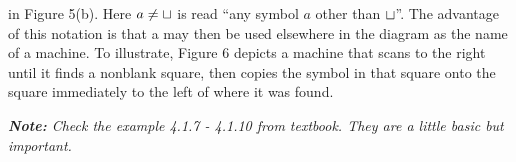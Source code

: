 \begin{example}{}
in Figure 5(b). Here $a \neq \sqcup$ is read ``any symbol $a$ other than $\sqcup$''. The advantage of this notation is that a may then be used elsewhere in the diagram as the name of a machine. To illustrate, Figure 6 depicts a machine that scans to the right until it finds a nonblank square, then copies the symbol in that square onto the square immediately to the left of where it was found.
\begin{figure}[H]
  \centering
  \begin{minipage}{.5\linewidth}
    \centering
  \end{minipage}
  \caption{}
\end{figure}
\end{example}

\textit{\textbf{Note:} Check the example 4.1.7 - 4.1.10 from textbook. They are a little basic but important.}

